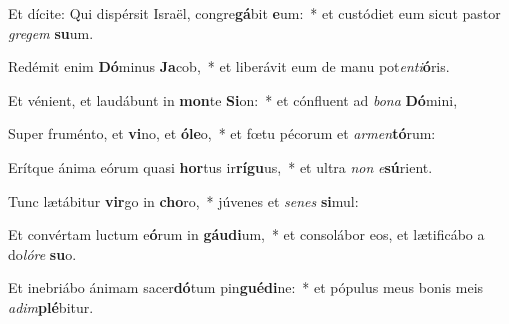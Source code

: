 \item Et dícite: Qui dispérsit Israël, congre\textbf{gá}bit \textbf{e}um:~* et custódiet eum sicut pastor \textit{gre}\textit{gem} \textbf{su}um.
\item Redémit enim \textbf{Dó}minus \textbf{Ja}cob,~* et liberávit eum de manu pot\textit{en}\textit{ti}\textbf{ó}ris.
\item Et vénient, et laudábunt in \textbf{mon}te \textbf{Si}on:~* et cónfluent ad \textit{bo}\textit{na} \textbf{Dó}mini,
\item Super fruménto, et \textbf{vi}no, et \textbf{ó}\textbf{le}o,~* et fœtu pécorum et \textit{ar}\textit{men}\textbf{tó}rum:
\item Erítque ánima eórum quasi \textbf{hor}tus ir\textbf{rí}\textbf{gu}us,~* et ultra \textit{non} \textit{e}\textbf{sú}rient.
\item Tunc lætábitur \textbf{vir}go in \textbf{cho}ro,~* júvenes et \textit{se}\textit{nes} \textbf{si}mul:
\item Et convértam luctum e\textbf{ó}rum in \textbf{gáu}\textbf{di}um,~* et consolábor eos, et lætificábo a do\textit{ló}\textit{re} \textbf{su}o.
\item Et inebriábo ánimam sacer\textbf{dó}tum pin\textbf{gué}\textbf{di}ne:~* et pópulus meus bonis meis \textit{ad}\textit{im}\textbf{plé}bitur.
